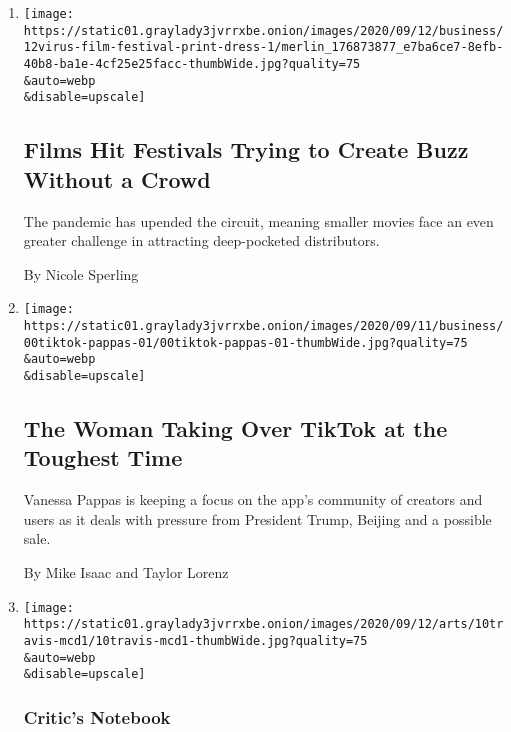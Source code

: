\begin{enumerate}
\def\labelenumi{\arabic{enumi}.}
\item
  \href{/2020/09/12/business/media/concrete-cowboy-toronto-film-festival.html}{}

  \texttt{[image: https://static01.graylady3jvrrxbe.onion/images/2020/09/12/business/12virus-film-festival-print-dress-1/merlin\_176873877\_e7ba6ce7-8efb-40b8-ba1e-4cf25e25facc-thumbWide.jpg?quality=75\\\&auto=webp\\\&disable=upscale]}

  \hypertarget{films-hit-festivals-trying-to-create-buzz-without-a-crowd}{%
  \subsection{Films Hit Festivals Trying to Create Buzz Without a
  Crowd}\label{films-hit-festivals-trying-to-create-buzz-without-a-crowd}}

  The pandemic has upended the circuit, meaning smaller movies face an
  even greater challenge in attracting deep-pocketed distributors.

  By Nicole Sperling
\item
  \href{/2020/09/11/technology/tiktok-vanessa-pappas-bytedance.html}{}

  \texttt{[image: https://static01.graylady3jvrrxbe.onion/images/2020/09/11/business/00tiktok-pappas-01/00tiktok-pappas-01-thumbWide.jpg?quality=75\\\&auto=webp\\\&disable=upscale]}

  \hypertarget{the-woman-taking-over-tiktok-at-the-toughest-time}{%
  \subsection{The Woman Taking Over TikTok at the Toughest
  Time}\label{the-woman-taking-over-tiktok-at-the-toughest-time}}

  Vanessa Pappas is keeping a focus on the app's community of creators
  and users as it deals with pressure from President Trump, Beijing and
  a possible sale.

  By Mike Isaac and Taylor Lorenz
\item
  \href{/2020/09/11/arts/music/travis-scott-mcdonalds.html}{}

  \texttt{[image: https://static01.graylady3jvrrxbe.onion/images/2020/09/12/arts/10travis-mcd1/10travis-mcd1-thumbWide.jpg?quality=75\\\&auto=webp\\\&disable=upscale]}

  \hypertarget{critics-notebook}{%
  \subsubsection{Critic's Notebook}\label{critics-notebook}}


\end{enumerate}
